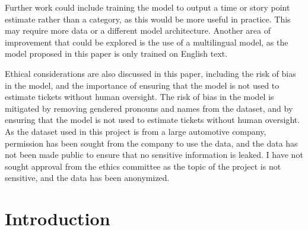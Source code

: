 \documentclass{UoYCSproject}
\begin{document}
\begin{summary}
        Further work could include training the model to output a time or story point estimate rather than a category, as this would be more useful in practice.
        This may require more data or a different model architecture.
        Another area of improvement that could be explored is the use of a multilingual model, as the model proposed in this paper is only trained on English text. \par

        Ethical considerations are also discussed in this paper, including the risk of bias in the model, and the importance of ensuring that the model is not used to estimate tickets without human oversight. The risk of bias in the model is mitigated by removing gendered pronouns and names from the dataset, and by ensuring that the model is not used to estimate tickets without human oversight.
        As the dataset used in this project is from a large automotive company, permission has been sought from the company to use the data, and the data has not been made public to ensure that no sensitive information is leaked.
        I have not sought approval from the ethics committee as the topic of the project is not sensitive, and the data has been anonymized.
        \par


    \end{summary}

    \chapter{Introduction}
    \label{ch:introduction}
    \setcounter{page}{1}
\end{document}
